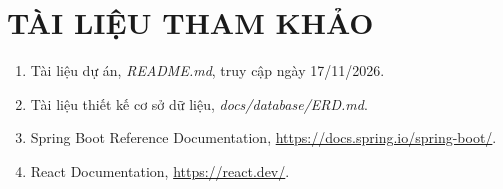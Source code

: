 \chapter*{TÀI LIỆU THAM KHẢO}
\begin{enumerate}
\item Tài liệu dự án, \textit{README.md}, truy cập ngày 17/11/2026.
\item Tài liệu thiết kế cơ sở dữ liệu, \textit{docs/database/ERD.md}.
\item Spring Boot Reference Documentation, \url{https://docs.spring.io/spring-boot/}.
\item React Documentation, \url{https://react.dev/}.
\end{enumerate}
